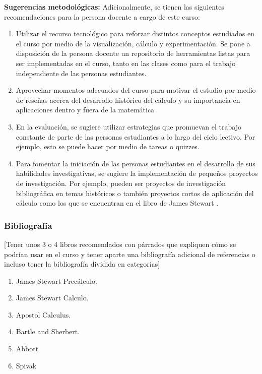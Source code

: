 \begin{refsection}
\textbf{Sugerencias metodológicas:} Adicionalmente, se tienen las siguientes recomendaciones para la persona docente a cargo de este curso:
\begin{enumerate}
    \item Utilizar el recurso tecnológico para reforzar distintos conceptos estudiados en el curso por medio de la visualización, cálculo y experimentación. Se pone a disposición de la persona docente un repositorio de herramientas listas para ser implementadas en el curso, tanto en las clases como para el trabajo independiente de las personas estudiantes.
    \item Aprovechar momentos adecuados del curso para motivar el estudio por medio de reseñas acerca del desarrollo histórico del cálculo y su importancia en aplicaciones dentro y fuera de la matemática
    \item En la evaluación, se sugiere utilizar estrategias que promuevan el trabajo constante de parte de las personas estudiantes a lo largo del ciclo lectivo. Por ejemplo, esto se puede hacer por medio de tareas o quizzes.
    \item Para fomentar la iniciación de las personas estudiantes en el desarrollo de sus habilidades investigativas, se sugiere la implementación de pequeños proyectos de investigación. Por ejemplo, pueden ser proyectos de investigación bibliográfica en temas históricos o también proyectos cortos de aplicación del cálculo como los que se encuentran en el libro de James Stewart \cite{StewartCalculus}.
\end{enumerate}

\cite{liebeck2016pure}

\subsubsection*{Bibliografía}

[Tener unos 3 o 4 libros recomendados con párrados que expliquen cómo se podrían usar en el curso y tener aparte una bibliografía adicional de referencias o incluso tener la bibliografía dividida en categorías]

\begin{enumerate}
    \item James Stewart Precálculo.
    \item James Stewart Calculo.
    \item Apostol Calculus.
    \item Bartle and Sherbert.
    \item Abbott
    \item Spivak
\end{enumerate}

\printbibliography[heading=subbibliography,section=\the\value{refsection}]
\end{refsection}

